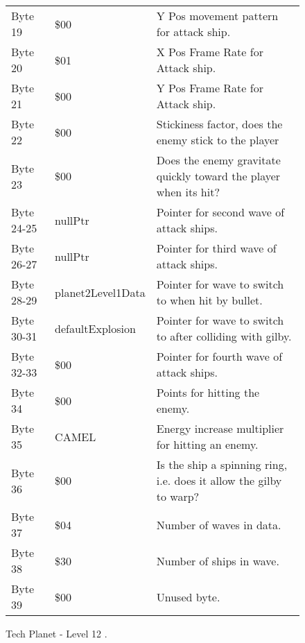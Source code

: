\begin{figure}[H]
{\begin{adjustbox}{width=12cm}
\begin{tabular}{lll}
 Byte 19    & \$00               & Y Pos movement pattern for attack ship.                             \\
 Byte 20    & \$01               & X Pos Frame Rate for Attack ship.                                   \\
 Byte 21    & \$00               & Y Pos Frame Rate for Attack ship.                                   \\
 Byte 22    & \$00               & Stickiness factor, does the enemy stick to the player               \\
 Byte 23    & \$00               & Does the enemy gravitate quickly toward the player when its hit?    \\
 Byte 24-25 & nullPtr           & Pointer for second wave of attack ships.                            \\
 Byte 26-27 & nullPtr           & Pointer for third wave of attack ships.                             \\
 Byte 28-29 & planet2Level1Data & Pointer for wave to switch to when hit by bullet.                   \\
 Byte 30-31 & defaultExplosion  & Pointer for  wave to switch to after colliding with gilby.          \\
 Byte 32-33 & \$00               & Pointer for fourth wave of attack ships.                            \\
 Byte 34    & \$00               & Points for hitting the enemy.                                       \\
 Byte 35    & CAMEL             & Energy increase multiplier for hitting an enemy.                    \\
 Byte 36    & \$00               & Is the ship a spinning ring, i.e. does it allow the gilby to warp?  \\
 Byte 37    & \$04               & Number of waves in data.                                            \\
 Byte 38    & \$30               & Number of ships in wave.                                            \\
 Byte 39    & \$00               & Unused byte.                                                        \\
\bottomrule
\end{tabular}

  \end{adjustbox}

  }\caption*{Tech Planet - Level 12
.}
\end{figure}

